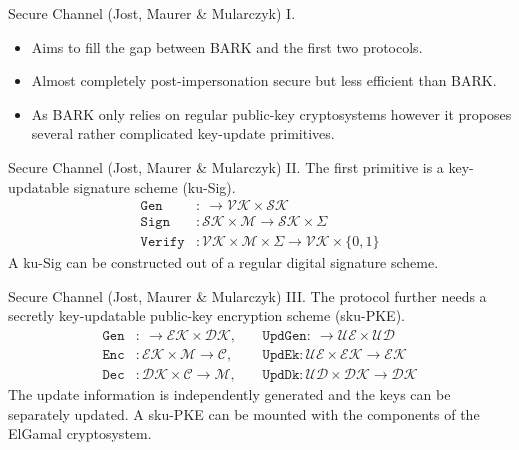 \documentclass{beamer}
\begin{document}
\begin{frame}{Secure Channel (Jost, Maurer \& Mularczyk) I.}
  \begin{itemize}
  \item Aims to fill the gap between BARK and the first two protocols.
  \item Almost completely post-impersonation secure but less efficient than BARK.
  \item As BARK only relies on regular public-key cryptosystems however
    it proposes several rather complicated key-update primitives.
  \end{itemize}
\end{frame}

\begin{frame}{Secure Channel (Jost, Maurer \& Mularczyk) II.}
  The first primitive is a key-updatable signature scheme (ku-Sig).
  \begin{align*}
    \texttt{Gen} & : \ \rightarrow \mathcal{VK} \times \mathcal{SK} \\
    \texttt{Sign} & : \mathcal{SK} \times \mathcal{M} \rightarrow \mathcal{SK} \times \Sigma \\
    \texttt{Verify} & : \mathcal{VK} \times \mathcal{M} \times \Sigma
             \rightarrow \mathcal{VK} \times \{0,1\}
  \end{align*}
A ku-Sig can be constructed out of a regular digital signature scheme.
\end{frame}

\begin{frame}{Secure Channel (Jost, Maurer \& Mularczyk) III.}
  The protocol further needs a secretly key-updatable public-key encryption scheme (sku-PKE).
   \begin{align*}
     \texttt{Gen} & : \ \rightarrow \mathcal{EK} \times \mathcal{DK}, \
     && \texttt{UpdGen} : \ \rightarrow \mathcal{UE} \times \mathcal{UD} \\
     \texttt{Enc} & : \mathcal{EK} \times \mathcal{M} \rightarrow \mathcal{C}, \
     && \texttt{UpdEk} : \mathcal{UE} \times \mathcal{EK} \rightarrow \mathcal{EK} \\
     \texttt{Dec} & : \mathcal{DK} \times \mathcal{C} \rightarrow \mathcal{M}, \
     && \texttt{UpdDk} :  \mathcal{UD} \times \mathcal{DK} \rightarrow \mathcal{DK}
  \end{align*}
The update information is independently generated and the keys
can be separately updated. A sku-PKE can be mounted with the
components of the ElGamal cryptosystem.
\end{frame}
\end{document}
